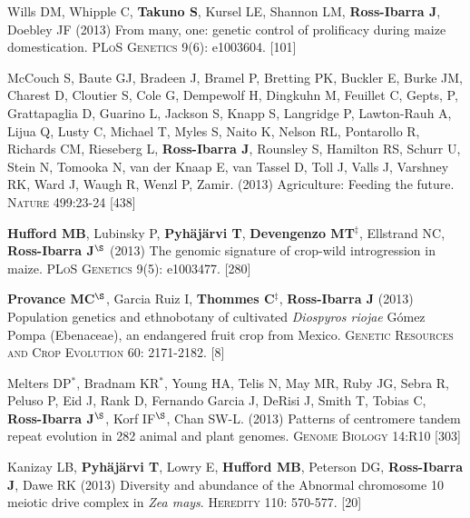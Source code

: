 \documentclass[letterpaper,10pt]{article}
\begin{document}
\begin{etaremune}
\item Wills DM, Whipple C, {\bf Takuno S}, Kursel LE, Shannon LM, {\bf Ross-Ibarra J}, Doebley JF (2013) From many, one: genetic control of prolificacy during maize domestication. \textsc{PLoS Genetics} 9(6): e1003604. %
 [101]\\


\item McCouch S, Baute GJ, Bradeen J, Bramel P, Bretting PK, Buckler E, Burke JM, Charest D, Cloutier S, Cole G, Dempewolf H, Dingkuhn M, Feuillet C, Gepts, P, Grattapaglia D, Guarino L, Jackson S, Knapp S, Langridge P, Lawton-Rauh A, Lijua Q, Lusty C, Michael T, Myles S, Naito K, Nelson RL, Pontarollo R, Richards CM, Rieseberg L, {\bf Ross-Ibarra J}, Rounsley S, Hamilton RS, Schurr U, Stein N, Tomooka N, van der Knaap E, van Tassel D, Toll J, Valls J, Varshney RK, Ward J, Waugh R, Wenzl P, Zamir. (2013) Agriculture: Feeding the future. \textsc{Nature} 499:23-24
 [438]\\


\item {\bf Hufford MB}, Lubinsky P, {\bf Pyh\"aj\"arvi T}, {\bf Devengenzo MT}$^\ddagger$, Ellstrand NC, {\bf Ross-Ibarra J}$^\S$ (2013) The genomic signature of crop-wild introgression in maize. \textsc{PLoS Genetics} 9(5): e1003477. %
 [280]\\


\item {\bf Provance MC}$^\S$, Garcia Ruiz I, {\bf Thommes C}$^\ddagger$, {\bf Ross-Ibarra J} (2013) Population genetics and ethnobotany of cultivated \emph{Diospyros riojae} G\'omez Pompa (Ebenaceae), an endangered fruit crop from Mexico. \textsc{Genetic Resources and Crop Evolution} 60: 2171-2182.
 [8]\\


\item Melters DP$^*$, Bradnam KR$^*$, Young HA, Telis N, May MR, Ruby JG, Sebra R, Peluso P, Eid J, Rank D, Fernando Garcia J, DeRisi J, Smith T, Tobias C, {\bf Ross-Ibarra J}$^\S$, Korf IF$^\S$, Chan SW-L. (2013) Patterns of centromere tandem repeat evolution in 282 animal and plant genomes. \textsc{Genome Biology} 14:R10
 [303]\\


\item Kanizay LB, {\bf Pyh\"aj\"arvi T}, Lowry E, {\bf Hufford MB}, Peterson DG, {\bf Ross-Ibarra J}, Dawe RK (2013) Diversity and abundance of the Abnormal chromosome 10 meiotic drive complex in \emph{Zea mays}. \textsc{Heredity} 110: 570-577.
 [20]\\



\end{etaremune}
\end{document}
